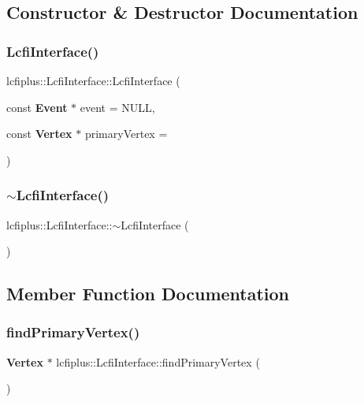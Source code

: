 \subsection{Constructor \& Destructor Documentation}
\mbox{\label{classlcfiplus_1_1LcfiInterface_a3bc5a9591f307e4eb97d09102fb6a4f2}} 
\subsubsection{Lcfi\+Interface()}
{\footnotesize\ttfamily lcfiplus\+::\+Lcfi\+Interface\+::\+Lcfi\+Interface (\begin{DoxyParamCaption}\item[{const \textbf{ Event} $\ast$}]{event = {\ttfamily NULL},  }\item[{const \textbf{ Vertex} $\ast$}]{primary\+Vertex = {} }\end{DoxyParamCaption})}

\mbox{\label{classlcfiplus_1_1LcfiInterface_a14b3b074fef18207e83ed71253d1103f}} 
\subsubsection{$\sim$\+Lcfi\+Interface()}
{\footnotesize\ttfamily lcfiplus\+::\+Lcfi\+Interface\+::$\sim$\+Lcfi\+Interface (\begin{DoxyParamCaption}{ }\end{DoxyParamCaption})}



\subsection{Member Function Documentation}
\mbox{\label{classlcfiplus_1_1LcfiInterface_a821d4e93fab8c1be65dbc0e3711d72c0}} 
\subsubsection{find\+Primary\+Vertex()}
{\footnotesize\ttfamily \textbf{ Vertex} $\ast$ lcfiplus\+::\+Lcfi\+Interface\+::find\+Primary\+Vertex (\begin{DoxyParamCaption}{ }\end{DoxyParamCaption})}



